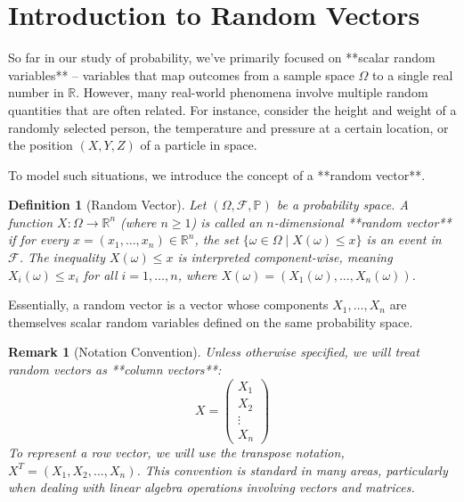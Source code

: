 \documentclass[11pt]{article}
\newtheorem{definition}[theorem]{Definition}
\newtheorem{remark}[theorem]{Remark}
\theoremstyle{definition} %
\newcommand{\R}{\mathbb{R}} %
\renewcommand{\P}{\mathbb{P}} %
\begin{document}
\clearpage %

\section{Introduction to Random Vectors}

So far in our study of probability, we've primarily focused on **scalar random variables** – variables that map outcomes from a sample space $\Omega$ to a single real number in $\R$. However, many real-world phenomena involve multiple random quantities that are often related. For instance, consider the height and weight of a randomly selected person, the temperature and pressure at a certain location, or the position $(X, Y, Z)$ of a particle in space.

To model such situations, we introduce the concept of a **random vector**.

\begin{definition}[Random Vector]
Let $(\Omega, \mathcal{F}, \P)$ be a probability space. A function $X: \Omega \to \R^n$ (where $n \ge 1$) is called an $n$-dimensional **random vector** if for every $x = (x_1, \dots, x_n) \in \R^n$, the set $\{\omega \in \Omega \mid X(\omega) \le x\}$ is an event in $\mathcal{F}$. The inequality $X(\omega) \le x$ is interpreted component-wise, meaning $X_i(\omega) \le x_i$ for all $i = 1, \dots, n$, where $X(\omega) = (X_1(\omega), \dots, X_n(\omega))$.
\end{definition}

Essentially, a random vector is a vector whose components $X_1, \dots, X_n$ are themselves scalar random variables defined on the same probability space.

\begin{remark}[Notation Convention]
Unless otherwise specified, we will treat random vectors as **column vectors**:
\[ X = \begin{pmatrix} X_1 \\ X_2 \\ \vdots \\ X_n \end{pmatrix} \]
To represent a row vector, we will use the transpose notation, $X^T = (X_1, X_2, \dots, X_n)$. This convention is standard in many areas, particularly when dealing with linear algebra operations involving vectors and matrices.
\end{remark}
\end{document}

